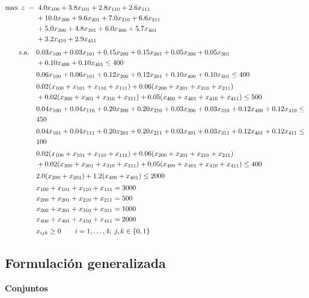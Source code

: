 {\small
\begin{align}
\max\; z \;=\;
&\; 4.0x_{100} + 3.8x_{101} + 2.8x_{110} + 2.6x_{111} \notag\\
&+ 10.0x_{200} + 9.6x_{201} + 7.0x_{210} + 6.6x_{211} \notag\\
&+ 5.0x_{300} + 4.8x_{301} + 6.0x_{400} + 5.7x_{401} \notag\\
&+ 3.2x_{410} + 2.9x_{411}
\\[4pt]
\text{s.a.}\quad
&0.03x_{100}+0.03x_{101}+0.15x_{200}+0.15x_{201}+0.05x_{300}+0.05x_{301} \notag\\
&+0.10x_{400}+0.10x_{401}\le400 \\[2pt]
&0.06x_{100}+0.06x_{101}+0.12x_{200}+0.12x_{201}+0.10x_{400}+0.10x_{401}\le400 \\[2pt]
&0.02(x_{100}+x_{101}+x_{110}+x_{111})
+0.06(x_{200}+x_{201}+x_{210}+x_{211}) \notag\\
&+0.02(x_{300}+x_{301}+x_{310}+x_{311})
+0.05(x_{400}+x_{401}+x_{410}+x_{411})\le500 \\[2pt]
&0.04x_{100}+0.04x_{110}+0.20x_{200}+0.20x_{210}
+0.03x_{300}+0.03x_{310}+0.12x_{400}+0.12x_{410}\leq \notag\ \\ & 450  \\[2pt]
&0.04x_{101}+0.04x_{111}+0.20x_{201}+0.20x_{211}
+0.03x_{301}+0.03x_{311}+0.12x_{401}+0.12x_{411}\leq \notag\ \\ & 100  \\[2pt]
&0.02(x_{100}+x_{101}+x_{110}+x_{111})
+0.06(x_{200}+x_{201}+x_{210}+x_{211}) \notag\\
&+0.02(x_{300}+x_{301}+x_{310}+x_{311})
+0.05(x_{400}+x_{401}+x_{410}+x_{411})\le400 \\[2pt]
&2.0(x_{200}+x_{201})+1.2(x_{400}+x_{401})\le2000 \\[2pt]
&x_{100}+x_{101}+x_{110}+x_{111}=3000 \\
&x_{200}+x_{201}+x_{210}+x_{211}=500 \\
&x_{300}+x_{301}+x_{310}+x_{311}=1000 \\
&x_{400}+x_{401}+x_{410}+x_{411}=2000 \\[2pt]
&x_{ijk}\ge0 \qquad i=1,\dots,4;\; j,k\in\{0,1\}
\end{align}
}




\subsection{Formulación generalizada}

\textbf{Conjuntos}\\[0.2cm]

